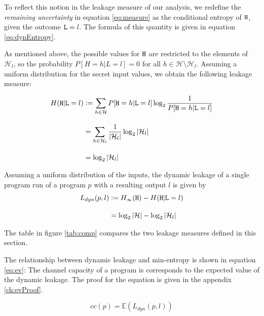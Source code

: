To reflect this notion in the leakage measure of our analysis, we redefine the \emph{remaining uncertainty} in equation \ref{eq:measure} as the conditional entropy of $\mathtt{H}$, given the outcome $\mathtt{L} = l$. The formula of this quantity is given in equation \ref{eq:dynEntropy}.

As mentioned above, the possible values for $\mathtt{H}$ are restricted to the elements of $\mathcal{H}_l$, so the probability $P[H = h | L = l] = 0$ for all $h \in \mathcal{H} \setminus \mathcal{H}_l$. Assuming a uniform distribution for the secret input values, we obtain the following leakage measure:

\begin{align*}
    H(\mathtt{H} | \mathtt{L} = l) &:= \sum\limits_{h \in \mathcal{H}} P[\mathtt{H} = h | \mathtt{L} = l] \log_2 \frac{1}{P[\mathtt{H} = h | \mathtt{L} = l]} \\[1em]
    &= \sum\limits_{h \in \mathcal{H}_l} \frac{1}{|\mathcal{H}_l|} \log_2 |\mathcal{H}_l| \\[1em]
    &= \log_2 |\mathcal{H}_l|
\end{align*}

\begin{theorem}
    Assuming a uniform distribution of the inputs, the dynamic leakage of a single program run of a program $p$ with a resulting output $l$ is given by 
    \begin{align*}
        L_{dyn}(p, l) &:= H_\infty(\mathtt{H}) - H(\mathtt{H} | \mathtt{L} = l) \\[1em]
        &= \log_2 |\mathcal{H}| - \log_2 |\mathcal{H}_l|
    \end{align*}
\end{theorem}

The table in figure \ref{tab:comp} compares the two leakage measures defined in this section.

The relationship between dynamic leakage and min-entropy is shown in equation \ref{eq:ev}: The channel capacity of a program is corresponds to the expected value of the dynamic leakage. The proof for the equation is given in the appendix \ref{ch:evProof}.

\begin{center}
    \begin{equation}\label{eq:ev}
        cc(p) = \mathbb{E}(L_{dyn}(p, l))
    \end{equation}
\end{center}


